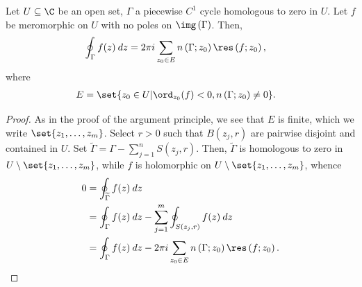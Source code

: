 \documentclass[10pt]{mypackage}
\begin{document}
\begin{theorem}
  Let $U\subseteq \C$ be an open set, $\Gamma$ a piecewise $C^{1}$ cycle homologous to zero in $U$. Let $f$ be meromorphic on $U$ with no poles on $\img\left( \Gamma \right)$. Then,
  \begin{align*}
    \oint_{\Gamma}^{} f(z)\:dz &= 2\pi i \sum_{z_0\in E} n\left( \Gamma;z_0 \right)\res\left( f;z_0 \right),
  \end{align*}
  where
  \begin{align*}
    E &= \set{z_0\in U | \ord_{z_0}(f) < 0, n\left( \Gamma;z_0 \right) \neq 0}.
  \end{align*}
\end{theorem}
\begin{proof}
  As in the proof of the argument principle, we see that $E$ is finite, which we write $\set{z_1,\dots,z_m}$. Select $r > 0$ such that $ B\left( z_j,r \right) $ are pairwise disjoint and contained in $U$. Set $ \widetilde{\Gamma} = \Gamma - \sum_{j=1}^{n} S\left( z_j,r \right) $. Then, $ \widetilde{\Gamma} $ is homologous  to zero in $U\setminus \set{z_1,\dots,z_m}$, while $f$ is holomorphic on $U\setminus \set{z_1,\dots,z_m}$, whence
  \begin{align*}
    0 &= \oint_{ \widetilde{\Gamma} }^{} f(z)\:dz\\
      &= \oint_{\Gamma}^{} f(z)\:dz - \sum_{j=1}^{m} \oint_{S\left( z_j,r \right)}^{} f(z)\:dz\\
      &= \oint_{\Gamma}^{} f(z)\:dz - 2\pi i \sum_{z_0\in E}n\left( \Gamma;z_0 \right)\res\left( f;z_0 \right).
  \end{align*}
\end{proof}
\end{document}
